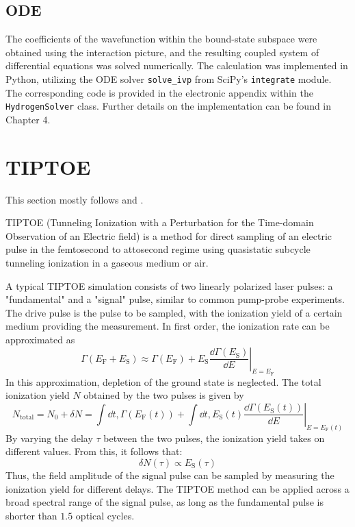 \subsection{ODE}
The coefficients of the wavefunction within the bound-state subspace were obtained using the interaction picture, and the resulting coupled system of differential equations was solved numerically.
The calculation was implemented in Python, utilizing the ODE solver \texttt{solve\_ivp} from SciPy’s \texttt{integrate} module.
The corresponding code is provided in the electronic appendix within the \texttt{HydrogenSolver} class.
Further details on the implementation can be found in Chapter 4.




\section{TIPTOE}
This section mostly follows \cite{Park:18} and \cite{manorammasterthesis}.

TIPTOE (Tunneling Ionization with a Perturbation for the Time-domain Observation of an Electric field) is a method for direct sampling of an electric pulse in the femtosecond to attosecond regime using quasistatic subcycle tunneling ionization in a gaseous medium or air.

A typical TIPTOE simulation consists of two linearly polarized laser pulses: a "fundamental" and a "signal" pulse, similar to common pump-probe experiments.
The drive pulse is the pulse to be sampled, with the ionization yield of a certain medium providing the measurement.
In first order, the ionization rate can be approximated as
\begin{equation}
    \Gamma(E_{\mathrm{F}}+E_{\mathrm{S}})\approx\Gamma(E_{\mathrm{F}})+\left.E_{\mathrm{S}}\frac{\dd \Gamma(E_{\mathrm{S}})}{\dd E}\right|_{E=E_{\mathrm{F}}}
\end{equation}
In this approximation, depletion of the ground state is neglected.
The total ionization yield $N$ obtained by the two pulses is given by
\begin{equation*}
    N_{\mathrm{total}}=N_0+\delta N = \int \dd t,\Gamma(E_{\mathrm{F}}(t))+\int \dd t,E_{\mathrm{S}}(t)\left.\frac{\dd \Gamma(E_{\mathrm{S}}(t))}{\dd E}\right|_{E=E_{\mathrm{F}}(t)}
\end{equation*}
By varying the delay $\tau$ between the two pulses, the ionization yield takes on different values.
From this, it follows that:
\begin{equation}
    \delta N(\tau)\propto E_{\mathrm{S}}(\tau) \label{eq:tiptoeprop}
\end{equation}
Thus, the field amplitude of the signal pulse can be sampled by measuring the ionization yield for different delays.
The TIPTOE method can be applied across a broad spectral range of the signal pulse, as long as the fundamental pulse is shorter than $1.5$ optical cycles.

